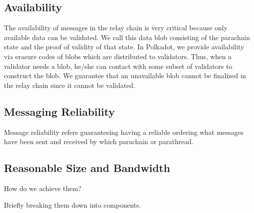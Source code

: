  \subsection{Availability}
The availability of messages in the relay chain is very critical because only available data can be validated. We call this data blob consisting of the parachain state and the proof of validity of that state. In Polkadot, we provide availability via erasure codes of blobs which are distributed to validators. Thus, when a validator needs a blob, he/she can contact with some subset of validators to construct the blob. We guarantee that an unavailable blob cannot be finalized in the relay chain since it cannot be validated.

 \subsection{Messaging Reliability} Message reliability refers guaranteeing having a reliable ordering what messages have been sent and received by which parachain or parathread. 

 \subsection{Reasonable Size and Bandwidth}

 How do we achieve them?

 Briefly breaking them down into components.

